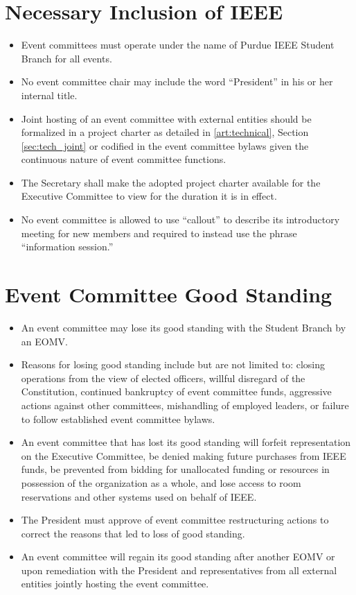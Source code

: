 \documentclass[12pt]{constitution}
\begin{document}
\section{Necessary Inclusion of IEEE}
\label{sec:inclusion}
\begin{itemize}
    \item Event committees must operate under the name of Purdue IEEE Student Branch for all events.
    \item No event committee chair may include the word ``President'' in his or her internal title.
    \item Joint hosting of an event committee with external entities should be formalized in a project charter as detailed in \ref{art:technical}, Section \ref{sec:tech_joint} or codified in the event committee bylaws given the continuous nature of event committee functions.
    \item The Secretary shall make the adopted project charter available for the Executive Committee to view for the duration it is in effect.
    \item No event committee is allowed to use ``callout'' to describe its introductory meeting for new members and required to instead use the phrase ``information session.''
\end{itemize}

\section{Event Committee Good Standing}
\label{sec:event_goodstand}
\begin{itemize}
    \item An event committee may lose its good standing with the Student Branch by an EOMV.
    \item Reasons for losing good standing include but are not limited to: closing operations from the view of elected officers, willful disregard of the Constitution, continued bankruptcy of event committee funds, aggressive actions against other committees, mishandling of employed leaders, or failure to follow established event committee bylaws.
    \item An event committee that has lost its good standing will forfeit representation on the Executive Committee, be denied making future purchases from IEEE funds, be prevented from bidding for unallocated funding or resources in possession of the organization as a whole, and lose access to room reservations and other systems used on behalf of IEEE.
    \item The President must approve of event committee restructuring actions to correct the reasons that led to loss of good standing.
    \item An event committee will regain its good standing after another EOMV or upon remediation with the President and representatives from all external entities jointly hosting the event committee.
\end{itemize}
\end{document}
